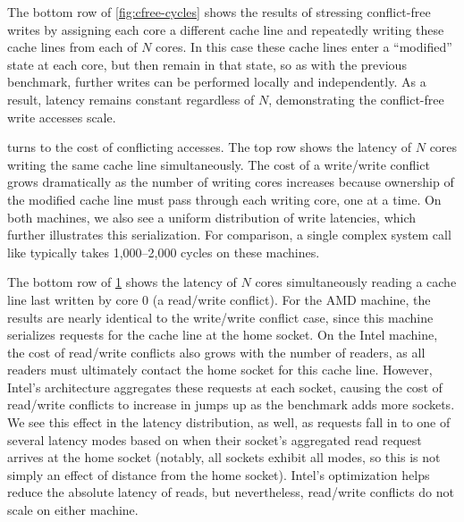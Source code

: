 The bottom row of \cref{fig:cfree-cycles} shows the results of
stressing conflict-free writes by assigning each core a different
cache line and repeatedly writing these cache lines from each of $N$
cores.  In this case these cache lines enter a ``modified'' state at
each core, but then remain in that state, so as with the previous
benchmark, further writes can be performed locally and independently.
As a result, latency remains constant regardless of $N$, demonstrating
the conflict-free write accesses scale.

\begin{figure}
  \centering
  
  \label{fig:conflict-cycles}
\end{figure}

 turns to the cost of conflicting
accesses.  The top row shows the latency of $N$ cores writing the same
cache line simultaneously.  The cost of a write/write conflict grows
dramatically as the number of writing cores increases because
ownership of the modified cache line must pass through each writing
core, one at a time.  On both machines, we also see a uniform
distribution of write latencies, which further illustrates this
serialization.  For comparison, a single complex system call like
 typically takes 1,000--2,000 cycles on these machines.

The bottom row of \cref{fig:conflict-cycles} shows the latency of $N$
cores simultaneously reading a cache line last written by core 0 (a
read/write conflict).  For the AMD machine, the results are nearly
identical to the write/write conflict case, since this machine
serializes requests for the cache line at the home socket.  On the
Intel machine, the cost of read/write conflicts also grows with the
number of readers, as all readers must ultimately contact the home
socket for this cache line.  However, Intel's architecture aggregates
these requests at each socket, causing the cost of read/write
conflicts to increase in jumps up as the benchmark adds more sockets.
We see this effect in the latency distribution, as well, as requests
fall in to one of several latency modes based on when their socket's
aggregated read request arrives at the home socket (notably, all
sockets exhibit all modes, so this is not simply an effect of distance
from the home socket).  Intel's optimization helps reduce the absolute
latency of reads, but nevertheless, read/write conflicts do not scale
on either machine.


